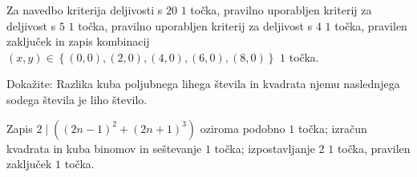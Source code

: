 \documentclass[addpoints]{exam}
\begin{document}
\begin{questions}
\begin{parts}
        \begin{solution}[6cm]
            Za navedbo kriterija deljivosti s $20$ $1$ točka, pravilno uporabljen kriterij za deljivost s $5$ $1$ točka, pravilno uporabljen kriterij za deljivost s $4$ $1$ točka, pravilen zaključek in zapis kombinacij $(x,y)\in\left\{(0,0),(2,0),(4,0),(6,0),(8,0)\right\}$ $1$ točka.
        \end{solution}


    \end{parts}

    \question[3]
    Dokažite: Razlika kuba poljubnega lihega števila in kvadrata njemu naslednjega sodega števila je liho število.

    \begin{solution}[7cm]
        Zapis $2\mid((2n-1)^2+(2n+1)^3)$ oziroma podobno $1$ točka; izračun kvadrata in kuba binomov in seštevanje $1$ točka; izpostavljanje $2$ $1$ točka, pravilen zaključek $1$ točka.
        
    \end{solution}








        






\end{questions}
\end{document}
